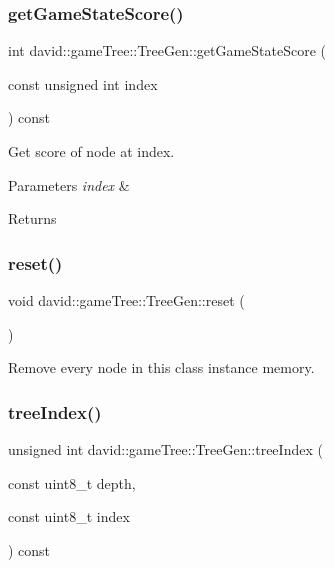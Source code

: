 \subsubsection{\texorpdfstring{get\+Game\+State\+Score()}{getGameStateScore()}}
{\footnotesize\ttfamily int david\+::game\+Tree\+::\+Tree\+Gen\+::get\+Game\+State\+Score (\begin{DoxyParamCaption}\item[{const unsigned int}]{index }\end{DoxyParamCaption}) const}

Get score of node at index. 
\begin{DoxyParams}{Parameters}
{\em index} & \\
\hline
\end{DoxyParams}
\begin{DoxyReturn}{Returns}

\end{DoxyReturn}
\mbox{\label{classdavid_1_1gameTree_1_1TreeGen_a3fdea406aba77b0553ebf507dc73c1b8}} 
\subsubsection{\texorpdfstring{reset()}{reset()}}
{\footnotesize\ttfamily void david\+::game\+Tree\+::\+Tree\+Gen\+::reset (\begin{DoxyParamCaption}{ }\end{DoxyParamCaption})}

Remove every node in this class instance memory. \mbox{\label{classdavid_1_1gameTree_1_1TreeGen_af4174f1ef14a61e88cf241a82c1761c7}} 
\subsubsection{\texorpdfstring{tree\+Index()}{treeIndex()}}
{\footnotesize\ttfamily unsigned int david\+::game\+Tree\+::\+Tree\+Gen\+::tree\+Index (\begin{DoxyParamCaption}\item[{const uint8\+\_\+t}]{depth,  }\item[{const uint8\+\_\+t}]{index }\end{DoxyParamCaption}) const}

